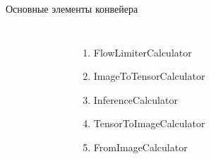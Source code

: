 \documentclass[aspectratio=169,xcolor=dvipsnames]{beamer}
\begin{document}
\begin{frame}{Основные элементы конвейера}
    \begin{columns}[c] %

        \begin{figure}[h]
            \label{ris:ORTModelData}
        \end{figure}

        \begin{enumerate}
            \item FlowLimiterCalculator
            \item ImageToTensorCalculator
            \item InferenceCalculator
            \item TensorToImageCalculator
            \item FromImageCalculator
        \end{enumerate}

    \end{columns}
\end{frame}

\end{document}

